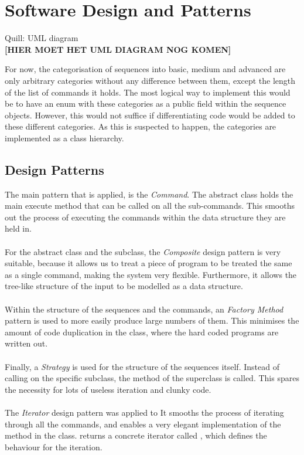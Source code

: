 \chapter{Software Design and Patterns}
Quill: UML diagram\\

\textbf{[HIER MOET HET UML DIAGRAM NOG KOMEN]}

For now, the categorisation of sequences into basic, medium and advanced are only arbitrary categories without any difference between them, except the length of the list of commands it holds. The most logical way to implement this would be to have an enum with these categories as a public field within the sequence objects. However, this would not suffice if differentiating code would be added to these different categories. As this is suspected to happen, the categories are implemented as a class hierarchy. 

\section{Design Patterns}
The main pattern that is applied, is the \textit{Command}. The  abstract class holds the main execute method that can be called on all the sub-commands. This smooths out the process of executing the commands within the data structure they are held in. \\~\\

For the  abstract class and the  subclass, the \textit{Composite} design pattern is very suitable, because it allows us to treat a piece of program to be treated the same as a single command, making the system very flexible. Furthermore, it allows the tree-like structure of the input to be modelled as a data structure. \\~\\

Within the structure of the sequences and the commands, an \textit{Factory Method} pattern is used to more easily produce large numbers of them. This minimises the amount of code duplication in the  class, where the hard coded programs are written out.\\~\\

Finally, a \textit{Strategy} is used for the structure of the sequences itself. Instead of calling on the specific subclass, the  method of the superclass is called. This spares the necessity for lots of useless iteration and clunky code. \\~\\

The \textit{Iterator} design pattern was applied to It smooths the process of iterating through all the commands, and enables a very elegant implementation of the  method in the  class.  returns a concrete iterator called , which defines the behaviour for the iteration. 
